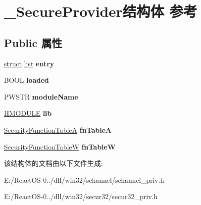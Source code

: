 \hypertarget{struct___secure_provider}{}\section{\+\_\+\+Secure\+Provider结构体 参考}
\label{struct___secure_provider}
\subsection*{Public 属性}
\begin{DoxyCompactItemize}
\item 
\mbox{\label{struct___secure_provider_a70c8a47e2c5f50036921069c58d90005}} 
\hyperlink{interfacestruct}{struct} \hyperlink{classlist}{list} {\bfseries entry}
\item 
\mbox{\label{struct___secure_provider_ac2ecda278498dfaa5b0359ff349e5da7}} 
B\+O\+OL {\bfseries loaded}
\item 
\mbox{\label{struct___secure_provider_a7c8aee4a5c8207b0bb209c4e07ce3228}} 
P\+W\+S\+TR {\bfseries module\+Name}
\item 
\mbox{\label{struct___secure_provider_ac3cc9890f3216604abfe28e506d728cf}} 
\hyperlink{interfacevoid}{H\+M\+O\+D\+U\+LE} {\bfseries lib}
\item 
\mbox{\label{struct___secure_provider_a575746b3fb37834c2611661c9e6bbd91}} 
\hyperlink{struct___s_e_c_u_r_i_t_y___f_u_n_c_t_i_o_n___t_a_b_l_e___a}{Security\+Function\+TableA} {\bfseries fn\+TableA}
\item 
\mbox{\label{struct___secure_provider_a66942ea6929a761d63b83efde74ecd74}} 
\hyperlink{struct___s_e_c_u_r_i_t_y___f_u_n_c_t_i_o_n___t_a_b_l_e___w}{Security\+Function\+TableW} {\bfseries fn\+TableW}
\end{DoxyCompactItemize}


该结构体的文档由以下文件生成\+:\begin{DoxyCompactItemize}
\item 
E\+:/\+React\+O\+S-\/0../dll/win32/schannel/schannel\+\_\+priv.\+h\item 
E\+:/\+React\+O\+S-\/0../dll/win32/secur32/secur32\+\_\+priv.\+h\end{DoxyCompactItemize}
